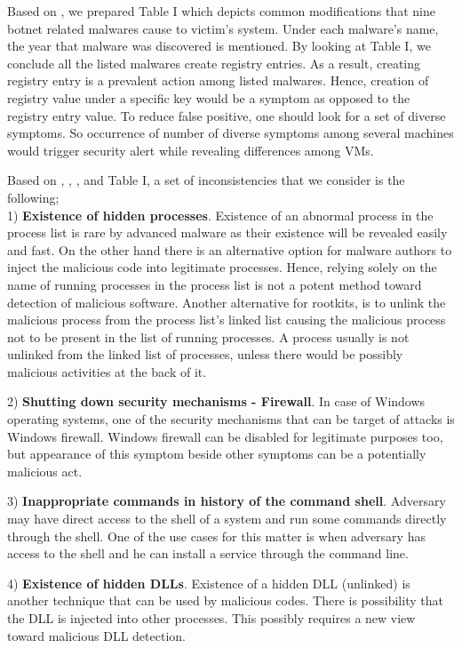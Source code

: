 \documentclass[conference]{IEEEtran}
\begin{document}
Based on \cite{ref20}, we prepared Table I which depicts common modifications that nine botnet related malwares cause to victim's system. Under each malware's name, the year that malware was discovered is mentioned. By looking at Table I, we conclude all the listed malwares create registry entries. As a result, creating registry entry is a prevalent action among listed malwares. Hence, creation of registry value under a specific key would be a symptom as opposed to the registry entry value. To reduce false positive, one should look for a set of diverse symptoms. So occurrence of number of diverse symptoms among several machines would trigger security alert while revealing differences among VMs.

Based on \cite{ref43}, \cite{ref44}, \cite{ref21}, \cite{ref35} and Table I, a set of inconsistencies that we consider is the following; \\

1) \textbf{Existence of hidden processes}. Existence of an abnormal process in the process list is rare by advanced malware as their existence will be revealed easily and fast. On the other hand there is an alternative option for malware authors to inject the malicious code into legitimate processes. Hence, relying solely on the name of running processes in the process list is not a  potent method toward detection of malicious software. Another alternative for rootkits, is to unlink the malicious process from the process list's linked list causing the malicious process not to be present in the list of running processes. A process usually is not unlinked from the linked list of processes, unless there would be possibly malicious activities at the back of it. 

2) \textbf{ Shutting down security mechanisms - Firewall}. In case of Windows operating systems, one of the security mechanisms that can be target of attacks is Windows firewall. Windows firewall can be disabled for legitimate purposes too, but appearance of this symptom beside other symptoms can be a potentially malicious act.

3) \textbf{Inappropriate commands in history of the command shell}. Adversary may have direct access to the shell of a system and run some commands directly through the shell. One of the use cases for this matter is when adversary has access to the shell and he can install a service through the command line. 

4) \textbf{Existence of hidden DLLs}. Existence of a hidden DLL (unlinked) is another technique that can be used by malicious codes. There is possibility that the DLL is injected into other processes. This possibly requires a new view toward malicious DLL detection. 
\end{document}
